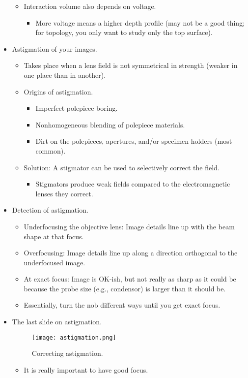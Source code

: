 \documentclass[../notes.tex]{subfiles}
\begin{document}
\begin{itemize}
\begin{itemize}
        \item Interaction volume also depends on voltage.
        \begin{itemize}
            \item More voltage means a higher depth profile (may not be a good thing; for topology, you only want to study only the top surface).
        \end{itemize}
    \end{itemize}
    \item Astigmation of your images.
    \begin{itemize}
        \item Takes place when a lens field is not symmetrical in strength (weaker in one place than in another).
        \item Origins of astigmation.
        \begin{itemize}
            \item Imperfect polepiece boring.
            \item Nonhomogeneous blending of polepiece materials.
            \item Dirt on the polepieces, apertures, and/or specimen holders (most common).
        \end{itemize}
        \item Solution: A stigmator can be used to selectively correct the field.
        \begin{itemize}
            \item Stigmators produce weak fields compared to the electromagnetic lenses they correct.
        \end{itemize}
    \end{itemize}
    \item Detection of astigmation.
    \begin{itemize}
        \item Underfocusing the objective lens: Image details line up with the beam shape at that focus.
        \item Overfocusing: Image details line up along a direction orthogonal to the underfocused image.
        \item At exact focus: Image is OK-ish, but not really as sharp as it could be because the probe size (e.g., condensor) is larger than it should be.
        \item Essentially, turn the nob different ways until you get exact focus.
    \end{itemize}
    \item The last slide on astigmation.
    \begin{figure}[H]
        \centering
        \texttt{[image: astigmation.png]}
        \caption{Correcting astigmation.}
        \label{fig:astigmation}
    \end{figure}
    \begin{itemize}
        \item It is really important to have good focus.
    \end{itemize}
\end{itemize}
\end{document}
